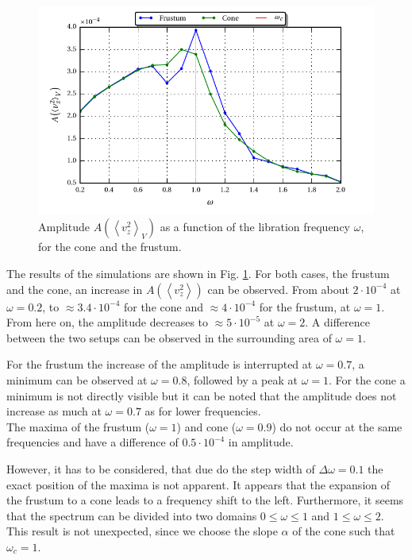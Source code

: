 \begin{figure}[!bp]
  \centering
  \includegraphics{gfx/cone/experiment/experiment.pdf}
  \caption{Amplitude $A\left(\left<v^2_z\right>_V\right)$ as a function of the libration frequency $\omega$,
            for the cone and the frustum.  \label{fig:cone_expseries} }
\end{figure}

The results of the simulations are shown in Fig. \ref{fig:cone_expseries}.
For both cases, the frustum and the cone, an increase in $A\left(\left<v^2_z\right>\right)$ can be observed.
From  about $2\cdot10^{-4}$ at $\omega=0.2$, to  $\approx 3.4\cdot10^{-4}$ for the cone and $\approx 4\cdot10^{-4}$ for the frustum,  at $\omega=1$.
From here on, the amplitude decreases to $\approx 5\cdot10^{-5}$ at $\omega=2$.
A difference between the two setups can be observed in the surrounding area of $\omega=1$.

For the frustum the increase of the amplitude is interrupted at $\omega=0.7$, a minimum can be observed at $\omega=0.8$, followed by
a peak at $\omega=1$. For the cone a minimum is not directly visible but it can be noted that the
amplitude does not increase as much at $\omega=0.7$ as for lower frequencies.\\
The maxima of the frustum ($\omega=1$) and cone ($\omega=0.9$) do not occur
at the same frequencies and have a difference of $0.5\cdot10^{-4}$ in amplitude.

However, it has to be considered, that due do the step width of $\Delta\omega = 0.1$ the exact position of the maxima is not apparent.
It appears that the expansion of the frustum to a cone leads to a frequency shift to the left.
Furthermore, it seems that the spectrum can be divided into two domains $0\leq\omega\leq1$ and $1 \leq \omega\leq 2$.
This result is not unexpected, since we choose the slope $\alpha$ of the cone such that $\omega_c=1$.


